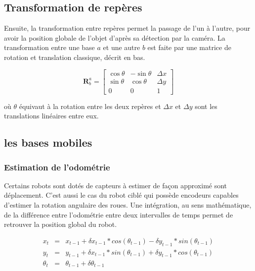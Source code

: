 \subsection{Transformation de repères}

Ensuite, la transformation entre repères permet la passage de l'un à l'autre, pour avoir la position globale de l'objet d'après sa détection par la caméra. La transformation entre une base $a$ et une autre $b$ est faite par une matrice de rotation et translation classique, décrit en bas. 

\begin{equation*}
	\mathbf{R}^{a}_{b} = 
	\begin{bmatrix} 
	 	\cos \theta &  -\sin \theta & \Delta x \\ \sin \theta & \cos \theta & \Delta y \\ 0 & 0 & 1
	 \end{bmatrix}
\end{equation*}

où $\theta$ équivaut à la rotation entre les deux repères et $\Delta x$ et $\Delta y$ sont les translations linéaires entre eux.

\subsection{les bases mobiles}

\subsubsection{Estimation de l'odométrie}

Certains robots sont dotés de capteurs à estimer de façon
approximé sont déplacement. C'est aussi le cas du robot ciblé qui
possède encodeurs capables d'estimer la rotation angulaire des
roues. Une intégration, au sens mathématique, de la différence entre
l'odométrie entre deux intervalles de temps permet de retrouver la
position global du robot.

\begin{equation*}
	\begin{array}{rcl}
		x_t &=& x_{t-1} + \delta x_{t-1} * cos(\theta_{t-1}) - \delta y_{t-1} * sin(\theta_{t-1}) \\
		y_t &=& y_{t-1} + \delta x_{t-1} * sin(\theta_{t-1}) + \delta y_{t-1} * cos(\theta_{t-1}) \\
		\theta_t &=& \theta_{t-1} + \delta\theta_{t-1}
	\end{array}
\end{equation*}


